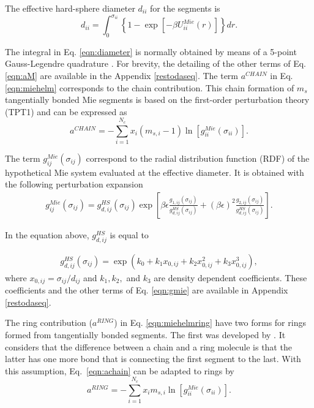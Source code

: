 The effective hard-sphere diameter $d_{ii}$ for the segments is
\begin{equation}
d_{ii} =\int_{0}^{\sigma_{ii}} \left \lbrace 1 - \exp \left [-\beta U^{Mie}_{ii}(r) \right ] \right \rbrace dr .
\label{eqn:diameter}
\end{equation}


The integral in Eq. \eqref{eqn:diameter} is normally obtained by means of a 5-point Gauss-Legendre quadrature \cite{papa2014}. For brevity, the detailing of the other terms of Eq. \eqref{eqn:aM} are available in the Appendix \ref{restodaseq}. The term $a^{CHAIN}$ in Eq. \ref{eqn:miehelm} corresponds to the chain contribution. This chain formation of $m_{s}$ tangentially bonded Mie segments is based on the first-order perturbation theory (TPT1)  \cite{papa2014} and can be expressed as
\begin{equation}
a^{CHAIN} =-\sum_{i=1}^{N_{c}} x_{i}(m_{s,i} - 1)\ln \left [ g_{ii}^{Mie}(\sigma_{ii}) \right] .
\label{eqn:achain}
\end{equation}

The term $g_{ij}^{Mie}(\sigma_{ij})$ correspond to the radial distribution function (RDF) of the hypothetical Mie system evaluated at the effective diameter. It is obtained with the following perturbation expansion
\begin{equation}
\begin{aligned}
g_{ij}^{Mie}(\sigma_{ij}) =g_{d,ij}^{HS}(\sigma_{ij})\exp \left [\beta\epsilon \frac{g_{1,ij}(\sigma_{ij})}{g_{d,ij}^{HS}(\sigma_{ij})} + (\beta\epsilon)^{2} \frac{g_{2,ij}(\sigma_{ij})}{g_{d,ij}^{HS}(\sigma_{ij})} \right] .
\end{aligned}
\label{eqn:gmie}
\end{equation}


In the equation above, $g_{d,ij}^{HS}$ is equal to 

\begin{equation}
\begin{aligned}
g_{d,ij}^{HS}(\sigma_{ij}) = \exp (k_{0} + k_{1} x_{0,ij} + k_{2} x_{0,ij}^{2} + k_{3} x_{0,ij}^{3}) ,
\end{aligned}
\label{eqn:ghs}
\end{equation}
where $x_{0,ij} = \sigma_{ij}/d_{ij}$ and $k_{1}, k_{2},$ and $k_{3}$ are density dependent coefficients. These coefficients and the other terms of Eq. \ref{eqn:gmie} are available in Appendix \ref{restodaseq}.  

The ring contribution ($a^{RING}$) in Eq. \ref{eqn:miehelmring} have two forms for rings formed from tangentially bonded segments. The first was developed by . It considers that the difference between a chain and a ring molecule is that the latter has one more bond that is connecting the first segment to the last. With this assumption, Eq.~\eqref{eqn:achain} can be adapted to rings by
\begin{equation}
a^{RING} =-\sum_{i=1}^{N_{c}} x_{i}m_{s,i}\ln[g_{ii}^{Mie}(\sigma_{ii})] .
\label{eqn:aringlafitte}
\end{equation}


